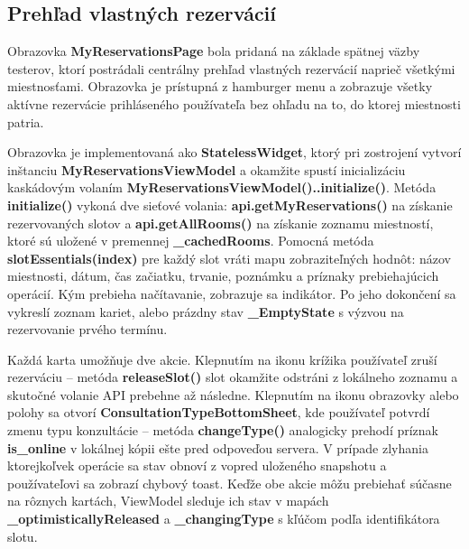 \subsection{Prehľad vlastných rezervácií}
\label{subsec:my-reservations}

Obrazovka \textbf{MyReservationsPage} bola pridaná na základe spätnej väzby
testerov, ktorí postrádali centrálny prehľad vlastných rezervácií naprieč
všetkými miestnosťami. Obrazovka je prístupná z hamburger menu a zobrazuje
všetky aktívne rezervácie prihláseného používateľa bez ohľadu na to,
do ktorej miestnosti patria.

Obrazovka je implementovaná ako \textbf{StatelessWidget}, ktorý pri zostrojení
vytvorí inštanciu \textbf{MyReservationsViewModel} a okamžite spustí
inicializáciu kaskádovým volaním \textbf{MyReservationsViewModel()..initialize()}.
Metóda \textbf{initialize()} vykoná dve sieťové volania:
\textbf{api.getMyReservations()} na získanie rezervovaných slotov
a \textbf{api.getAllRooms()} na získanie zoznamu miestností,
ktoré sú uložené v premennej \textbf{\_cachedRooms}.
Pomocná metóda \textbf{slotEssentials(index)} pre každý slot vráti mapu zobraziteľných hodnôt: názov miestnosti,
dátum, čas začiatku, trvanie, poznámku a príznaky prebiehajúcich operácií.
Kým prebieha načítavanie, zobrazuje sa indikátor.
Po jeho dokončení sa vykreslí zoznam kariet, alebo prázdny stav
\textbf{\_EmptyState} s výzvou na rezervovanie prvého termínu.

Každá karta umožňuje dve akcie. Klepnutím na ikonu krížika používateľ
zruší rezerváciu – metóda \textbf{releaseSlot()} slot okamžite odstráni
z lokálneho zoznamu a skutočné volanie API prebehne až následne.
Klepnutím na ikonu obrazovky alebo polohy sa otvorí
\textbf{ConsultationTypeBottomSheet}, kde používateľ potvrdí zmenu
typu konzultácie – metóda \textbf{changeType()} analogicky prehodí
príznak \textbf{is\_online} v lokálnej kópii ešte pred odpoveďou servera.
V prípade zlyhania ktorejkoľvek operácie sa stav obnoví z vopred
uloženého snapshotu a používateľovi sa zobrazí chybový toast.
Keďže obe akcie môžu prebiehať súčasne na rôznych kartách,
ViewModel sleduje ich stav v mapách \textbf{\_optimisticallyReleased}
a \textbf{\_changingType} s kľúčom podľa identifikátora slotu.


